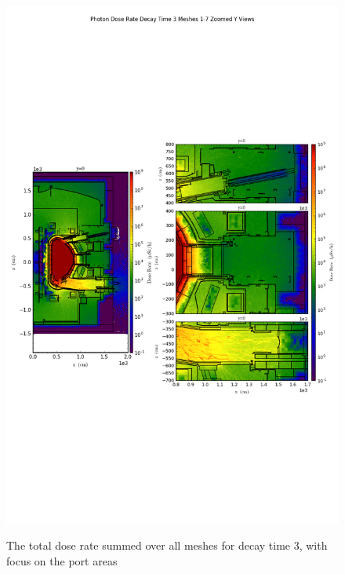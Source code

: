 \documentclass[12pt]{article}
\begin{document}
\begin{figure}[ht!]
\centering
\includegraphics[trim={0cm 9cm 0cm 10cm},clip,scale=0.75]{../plots/final_model/Photon_Dose_Rate_Decay_Time_3_Meshes_1-7_Zoomed_Y_Views.png}
\label{fig:photons_dc3_b4c_total_zoomed}
\caption{The total dose rate summed over all meshes for decay time 3, with focus on the port areas}
\end{figure}
\end{document}
